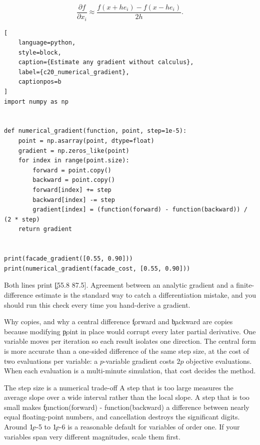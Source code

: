 \[
\frac{\partial f}{\partial x_i} \approx \frac{f(x + h e_i) - f(x - h e_i)}{2h}.
\]

\begin{lstlisting}[
    language=python,
    style=block,
    caption={Estimate any gradient without calculus},
    label={c20_numerical_gradient},
    captionpos=b
]
import numpy as np


def numerical_gradient(function, point, step=1e-5):
    point = np.asarray(point, dtype=float)
    gradient = np.zeros_like(point)
    for index in range(point.size):
        forward = point.copy()
        backward = point.copy()
        forward[index] += step
        backward[index] -= step
        gradient[index] = (function(forward) - function(backward)) / (2 * step)
    return gradient


print(facade_gradient([0.55, 0.90]))
print(numerical_gradient(facade_cost, [0.55, 0.90]))
\end{lstlisting}

Both lines print \c{[55.8 87.5]}. Agreement between an analytic gradient and a
finite-difference estimate is the standard way to catch a differentiation
mistake, and you should run this check every time you hand-derive a gradient.

\begin{SyntaxBox}{Why copies, and why a central difference}
\c{forward} and \c{backward} are copies because modifying \c{point} in place
would corrupt every later partial derivative. One variable moves per iteration
so each result isolates one direction. The central form is more accurate than a
one-sided difference of the same step size, at the cost of two evaluations per
variable: a $p$-variable gradient costs $2p$ objective evaluations. When each
evaluation is a multi-minute simulation, that cost decides the method.
\end{SyntaxBox}

\begin{ExplainBox}{The step size is a numerical trade-off}
A step that is too large measures the average slope over a wide interval rather
than the local slope. A step that is too small makes
\c{function(forward) - function(backward)} a difference between nearly equal
floating-point numbers, and cancellation destroys the significant digits.
Around \c{1e-5} to \c{1e-6} is a reasonable default for variables of order one.
If your variables span very different magnitudes, scale them first.
\end{ExplainBox}


